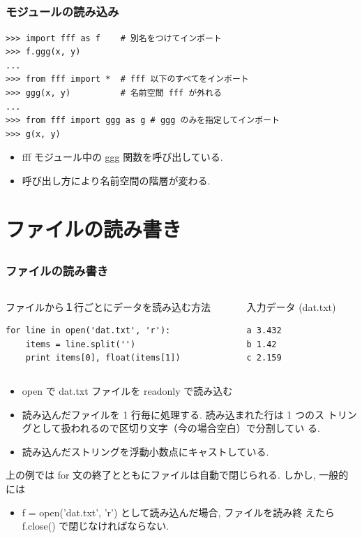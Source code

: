 \subsection*{\redm\whiteb\greenb}
\begin{frame}[t,fragile]
\frametitle{モジュールの読み込み}
\begin{lstlisting}
>>> import fff as f    # 別名をつけてインポート
>>> f.ggg(x, y)
...
>>> from fff import *  # fff 以下のすべてをインポート
>>> ggg(x, y)          # 名前空間 fff が外れる
...
>>> from fff import ggg as g # ggg のみを指定してインポート
>>> g(x, y)
\end{lstlisting}
\begin{itemize}
\item fff モジュール中の ggg 関数を呼び出している. 
\item 呼び出し方により名前空間の階層が変わる. 
\end{itemize}
\end{frame}

\section{ファイルの読み書き}

\subsection*{\redm\whitem\greenb}
\begin{frame}[t,fragile]
\frametitle{ファイルの読み書き}
\begin{columns}
\begin{column}{8cm}
ファイルから１行ごとにデータを読み込む方法
\begin{lstlisting}
for line in open('dat.txt', 'r'):
    items = line.split('')
    print items[0], float(items[1])
\end{lstlisting}
\end{column}
\begin{column}{4cm}
入力データ (dat.txt)
\begin{lstlisting}
a 3.432
b 1.42
c 2.159
\end{lstlisting}
\end{column}
\end{columns}

\begin{itemize}
\item open で dat.txt ファイルを readonly で読み込む
\item 読み込んだファイルを 1 行毎に処理する. 読み込まれた行は 1 つのス
      トリングとして扱われるので区切り文字（今の場合空白）で分割してい
      る. 
\item 読み込んだストリングを浮動小数点にキャストしている. 
\end{itemize}
上の例では for 文の終了とともにファイルは自動で閉じられる. しかし, 一般的には
\begin{itemize}
\item f = open('dat.txt', 'r') として読み込んだ場合, ファイルを読み終
      えたら f.close() で閉じなければならない. 
\end{itemize}
\end{frame}

